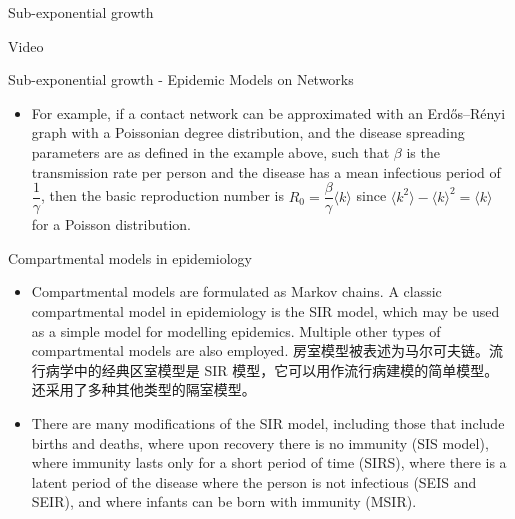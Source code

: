\documentclass[
  notheorems,
  aspectratio=54,
]{beamer}
\begin{document}
\begin{frame}{Sub-exponential growth}
  \begin{center}
  Video
  \end{center}
\end{frame}

\begin{frame}{Sub-exponential growth - Epidemic Models on Networks}
  \begin{itemize}
    \item For example, if a contact network can be approximated with an Erdős–Rényi graph with a Poissonian degree distribution, and the disease spreading parameters are as defined in the example above, such that
${\displaystyle \beta }$ is the transmission rate per person and the disease has a mean infectious period of
${\displaystyle {\dfrac {1}{\gamma }}}$, then the basic reproduction number is
${\displaystyle R_{0}={\dfrac {\beta }{\gamma }}{\langle k\rangle }}$ since
${\displaystyle {\langle k^{2}\rangle }-{\langle k\rangle }^{2}={\langle k\rangle }}$ for a Poisson distribution.
  \end{itemize}
\end{frame}

\begin{frame}{Compartmental models in epidemiology}
  \begin{itemize}
    \item Compartmental models are formulated as Markov chains. A classic compartmental model in epidemiology is the SIR model, which may be used as a simple model for modelling epidemics. Multiple other types of compartmental models are also employed. 房室模型被表述为马尔可夫链。流行病学中的经典区室模型是 SIR 模型，它可以用作流行病建模的简单模型。还采用了多种其他类型的隔室模型。
    \item There are many modifications of the SIR model, including those that include births and deaths, where upon recovery there is no immunity (SIS model), where immunity lasts only for a short period of time (SIRS), where there is a latent period of the disease where the person is not infectious (SEIS and SEIR), and where infants can be born with immunity (MSIR).
  \end{itemize}
\end{frame}
\end{document}
